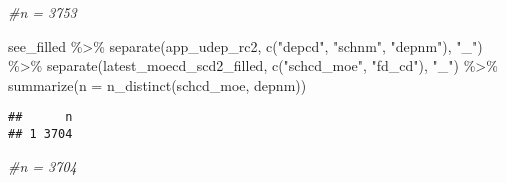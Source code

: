 \documentclass[
]{article}
\newenvironment{Shaded}{\begin{snugshade}}{\end{snugshade}}
\newcommand{\AttributeTok}[1]{\textcolor[rgb]{0.77,0.63,0.00}{#1}}
\newcommand{\CommentTok}[1]{\textcolor[rgb]{0.56,0.35,0.01}{\textit{#1}}}
\newcommand{\FunctionTok}[1]{\textcolor[rgb]{0.00,0.00,0.00}{#1}}
\newcommand{\NormalTok}[1]{#1}
\newcommand{\SpecialCharTok}[1]{\textcolor[rgb]{0.00,0.00,0.00}{#1}}
\newcommand{\StringTok}[1]{\textcolor[rgb]{0.31,0.60,0.02}{#1}}
\begin{document}
\begin{Shaded}
\begin{Highlighting}[]
\CommentTok{\#n = 3753}

\NormalTok{see\_filled }\SpecialCharTok{\%\textgreater{}\%} 
  \FunctionTok{separate}\NormalTok{(app\_udep\_rc2, }\FunctionTok{c}\NormalTok{(}\StringTok{"depcd"}\NormalTok{, }\StringTok{"schnm"}\NormalTok{, }\StringTok{"depnm"}\NormalTok{), }\StringTok{"\_"}\NormalTok{) }\SpecialCharTok{\%\textgreater{}\%}
  \FunctionTok{separate}\NormalTok{(latest\_moecd\_scd2\_filled, }\FunctionTok{c}\NormalTok{(}\StringTok{"schcd\_moe"}\NormalTok{, }\StringTok{"fd\_cd"}\NormalTok{), }\StringTok{"\_"}\NormalTok{) }\SpecialCharTok{\%\textgreater{}\%}
  \FunctionTok{summarize}\NormalTok{(}\AttributeTok{n =} \FunctionTok{n\_distinct}\NormalTok{(schcd\_moe, depnm))}
\end{Highlighting}
\end{Shaded}

\begin{verbatim}
##      n
## 1 3704
\end{verbatim}

\begin{Shaded}
\begin{Highlighting}[]
\CommentTok{\#n = 3704}
\end{Highlighting}
\end{Shaded}
\end{document}
